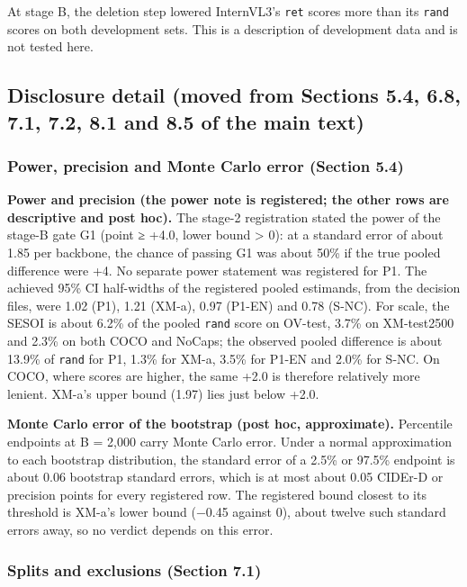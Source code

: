 \documentclass[manuscript,screen]{acmart}
\begin{document}
At stage B, the deletion step lowered InternVL3's \texttt{ret} scores more than its \texttt{rand}
scores on both development sets. This is a description of development data and is not tested here.

\subsection{Disclosure detail (moved from Sections 5.4, 6.8, 7.1, 7.2, 8.1 and 8.5 of the main
text)}\label{disclosure-detail-moved-from-sections-5.4-6.8-7.1-7.2-8.1-and-8.5-of-the-main-text}

\subsubsection{Power, precision and Monte Carlo error (Section
5.4)}\label{power-precision-and-monte-carlo-error-section-5.4}

\textbf{Power and precision (the power note is registered; the other rows are descriptive and post
hoc).} The stage-2 registration stated the power of the stage-B gate G1 (point ≥ +4.0, lower bound
\textgreater{} 0): at a standard error of about 1.85 per backbone, the chance of passing G1 was
about 50\% if the true pooled difference were +4. No separate power statement was registered for P1.
The achieved 95\% CI half-widths of the registered pooled estimands, from the decision files, were
1.02 (P1), 1.21 (XM-a), 0.97 (P1-EN) and 0.78 (S-NC). For scale, the SESOI is about 6.2\% of the
pooled \texttt{rand} score on OV-test, 3.7\% on XM-test2500 and 2.3\% on both COCO and NoCaps; the
observed pooled difference is about 13.9\% of \texttt{rand} for P1, 1.3\% for XM-a, 3.5\% for P1-EN
and 2.0\% for S-NC. On COCO, where scores are higher, the same +2.0 is therefore relatively more
lenient. XM-a's upper bound (1.97) lies just below +2.0.

\textbf{Monte Carlo error of the bootstrap (post hoc, approximate).} Percentile endpoints at B =
2,000 carry Monte Carlo error. Under a normal approximation to each bootstrap distribution, the
standard error of a 2.5\% or 97.5\% endpoint is about 0.06 bootstrap standard errors, which is at
most about 0.05 CIDEr-D or precision points for every registered row. The registered bound closest
to its threshold is XM-a's lower bound (−0.45 against 0), about twelve such standard errors away, so
no verdict depends on this error.

\subsubsection{Splits and exclusions (Section 7.1)}\label{splits-and-exclusions-section-7.1}
\end{document}
